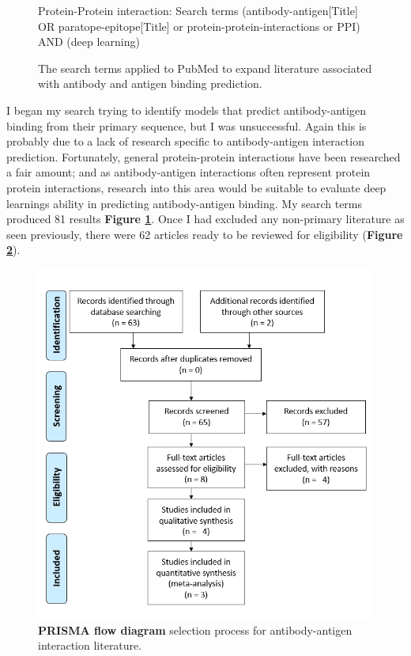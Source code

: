 \begin{figure}[H]
    \begin{redbox}{Protein-Protein interaction: Search terms}
        (antibody-antigen[Title] OR paratope-epitope[Title] or protein-protein-interactions or PPI) AND (deep learning) 
    \end{redbox}
    \caption{The search terms applied to PubMed to expand literature associated with antibody and antigen binding prediction.}
    \label{box:ppi_search}

\end{figure}

I began my search trying to identify models that predict antibody-antigen binding from their primary sequence, but I was unsuccessful. Again this is probably due to a lack of research specific to antibody-antigen interaction prediction. Fortunately, general protein-protein interactions have been researched a fair amount; and as antibody-antigen interactions often represent protein protein interactions, research into this area would be suitable to evaluate deep learnings ability in predicting antibody-antigen binding. My search terms produced 81 results \textbf{Figure \ref{box:ppi_search}}. Once I had excluded any non-primary literature as seen previously, there were 62 articles ready to be reviewed for eligibility (\textbf{Figure \ref{fig:PRISM-interactions}}).

\begin{figure}[H]
    \centering
    \includegraphics[width=0.6\linewidth]{./images/flow_diagram_interactions.png}
    \caption{\textbf{PRISMA flow diagram} selection process for antibody-antigen interaction literature.}
    \label{fig:PRISM-interactions}
\end{figure}


